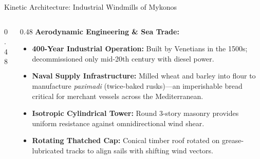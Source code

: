 \begin{frame}[label=windmills]{Kinetic Architecture: Industrial Windmills of Mykonos}
  \begin{columns}[T, onlytextwidth]
    \begin{column}{0.48\textwidth}
    \end{column}

    \begin{column}{0.48\textwidth}
      \textbf{\color{aegeanblue}Aerodynamic Engineering \& Sea Trade:}
      \vspace{0.2em}
      \begin{itemize}
          \setlength{\itemsep}{0.2em}
        \item \textbf{400-Year Industrial Operation:} Built by Venetians in the 1500s; decommissioned only mid-20th century with diesel power.
        \item \textbf{Naval Supply Infrastructure:} Milled wheat and barley into flour to manufacture \textit{paximadi} (twice-baked rusks)---an imperishable bread critical for merchant vessels across the Mediterranean.
        \item \textbf{Isotropic Cylindrical Tower:} Round 3-story masonry provides uniform resistance against omnidirectional wind shear.
        \item \textbf{Rotating Thatched Cap:} Conical timber roof rotated on grease-lubricated tracks to align sails with shifting wind vectors.
      \end{itemize}
    \end{column}
  \end{columns}
\end{frame}
